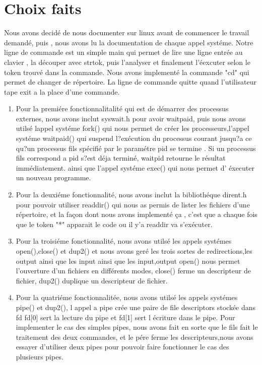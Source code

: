 \documentclass{article}
\begin{document}
\section{Choix faits}
Nous avons decidé de nous documenter sur linux avant de commencer le travail demandé, puis , nous avons lu la documentation de chaque appel systéme.
Notre ligne de commande est un simple main qui  permet de lire une ligne entrée au clavier , la découper avec strtok, puis l'analyser et finalement l'éexcuter selon le token trouvé dans la commande.
\newline Nous avons implementé la commande "cd" qui permet de changer de répertoire.
\newline La ligne de commande quitte quand l'utilisateur tape exit a la place d'une commande. 
\begin{enumerate}
\item Pour la premiére fonctionnalitalité  qui est de démarrer des processus externes,  nous avons inclut syswait.h  pour avoir waitpaid,
puis  nous avons utilsé lappel  systéme  fork() qui nous permet de créer les processeurs,l'appel systéme waitpaid() qui suspend l?exécution du processus courant jusqu?a ce qu?un processus fils spécifié par le paramétre pid se termine . Si un processus fils correspond a pid s?est déja terminé, waitpid retourne le résultat immédiatement.  ainsi que l'appel systéme exec() qui nous permet d' éxecuter un nouveau programme.
\item Pour la deuxiéme fonctionnalité, nous avons inclut  la bibliothéque dirent.h pour pouvoir  utiliser readdir() qui nous as permis de lister les fichiers d'une répertoire, et la fa\c{c}on dont nous avons implementé \c{c}a , c'est que a chaque fois que le token "*" apparait le code ou il y'a readdir va s'exécuter.
\item Pour la troisiéme fonctionnalité, nous avons utilsé les appels systémes open(),close() et dup2() et nous avons geré les trois  sortes de redirections,les output ainsi que les  input ainsi que les input,output
 \newline open() nous permet l'ouverture d'un fichiers en différents modes, \newline close() ferme un descripteur de fichier, \newline dup2() duplique un descripteur de fichier.
\item Pour la quatriéme fonctionnalitée, nous avons utilsé les appels systémes pipe() et dup2(), l appel  a pipe crée une paire de file descriptors stockée dans fd fd[0]  sert la lecture du pipe et fd[1]  sert  l écriture dans le pipe.
 \newline Pour implementer le cas des simples pipes, nous avons fait en sorte que le fils fait le traitement des deux commandes, et le pére ferme les descripteurs,nous avons essayer d'utiliser deux pipes pour pouvoir faire fonctionner le cas des plusieurs pipes.
\end{enumerate}
\end{document}
